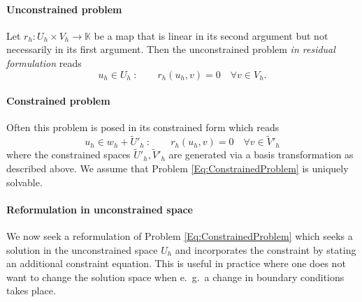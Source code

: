 \paragraph{Unconstrained problem}

Let $r_h : U_h \times V_h \to \mathbb{K}$ be a map that is linear in its
second argument but not necessarily in its first argument. 
Then the unconstrained problem \textit{in residual formulation} reads
\begin{equation}\label{Eq:UnconstrainedProblem}
u_h\in U_h\ : \qquad r_h(u_h,v) = 0 \quad \forall v\in V_h.
\end{equation}

\paragraph{Constrained problem}

Often this problem is posed in its constrained form which reads
\begin{equation}\label{Eq:ConstrainedProblem}
u_h\in w_h + \tilde{U}'_h\ : \qquad r_h(u_h,v) = 0 \quad \forall v\in \tilde{V}'_h
\end{equation}
where the constrained spaces $\tilde{U}'_h, \tilde{V}'_h$ are
generated via a basis transformation as described above. 
We assume that Problem \eqref{Eq:ConstrainedProblem} is uniquely
solvable. 

\paragraph{Reformulation in unconstrained space}

We now seek a reformulation of Problem \eqref{Eq:ConstrainedProblem}
which seeks a solution in the unconstrained space $U_h$ and
incorporates the constraint by stating an additional constraint
equation. This is useful in practice where one does not want to change
the solution space when e.~g.~a change in boundary conditions takes
place. 

